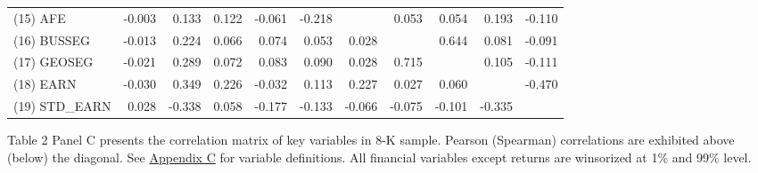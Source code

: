 \begin{table}[H]
\begin{center}
\begin{tabular}{lrrrrrrrrrr}
  		(15) AFE & -0.003 & 0.133 & 0.122 & -0.061 & -0.218 &  & 0.053 & 0.054 & 0.193 & -0.110 \\
  		(16) BUSSEG & -0.013 & 0.224 & 0.066 & 0.074 & 0.053 & 0.028 &  & 0.644 & 0.081 & -0.091 \\
  		(17) GEOSEG & -0.021 & 0.289 & 0.072 & 0.083 & 0.090 & 0.028 & 0.715 &  & 0.105 & -0.111 \\
  		(18) EARN & -0.030 & 0.349 & 0.226 & -0.032 & 0.113 & 0.227 & 0.027 & 0.060 &  & -0.470 \\
  		(19) STD\_EARN & 0.028 & -0.338 & 0.058 & -0.177 & -0.133 & -0.066 & -0.075 & -0.101 & -0.335 & \\
  		\bottomrule
  		\bottomrule
  	\end{tabular}%
  \end{center}
	\begin{footnotesize}
		\noindent Table 2 Panel C presents the correlation matrix of key variables in 8-K sample. Pearson (Spearman) correlations are exhibited above (below) the diagonal. See \hyperref[appc]{Appendix C} for variable definitions. All financial variables except returns are winsorized at 1\% and 99\% level. 
	\end{footnotesize}
\end{table}%